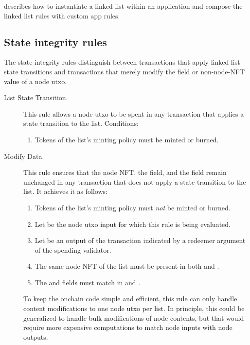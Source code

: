 \documentclass[../midgard.tex]{subfiles}
\begin{document}
 describes how to instantiate a linked list within an application and compose the linked list rules with custom app rules.

\subsection{State integrity rules}
\label{h:list-state-integrity-rules}

The state integrity rules distinguish between transactions that apply linked list state transitions and transactions that merely modify the  field or non-node-NFT value of a node utxo.

\begin{description}
    \item[List State Transition.]
    This rule allows a node utxo to be spent in any transaction that applies a state transition to the list.
    Conditions:
    \begin{enumerate}
        \item Tokens of the list's minting policy must be minted or burned.
    \end{enumerate}
    
    \item[Modify Data.]
    This rule ensures that the node NFT, the  field, and the  field remain unchanged in any transaction that does not apply a state transition to the list.
    It achieves it as follows:

    \begin{enumerate}
        \item Tokens of the list's minting policy must \emph{not} be minted or burned.
        \item Let  be the node utxo input for which this rule is being evaluated.
        \item Let  be an output of the transaction indicated by a redeemer argument of the spending validator.
        \item The same node NFT of the list must be present in both  and .
        \item The  and  fields must match in  and .
    \end{enumerate}
    
    To keep the onchain code simple and efficient, this rule can only handle content modifications to one node utxo per list.
    In principle, this could be generalized to handle bulk modifications of node contents, but that would require more expensive computations to match node inputs with node outputs.
\end{description}
\end{document}
